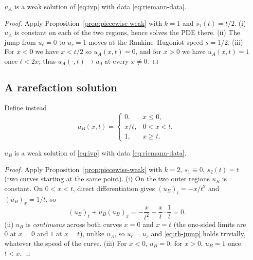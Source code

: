 \begin{proposition}
\label{prop:shock-is-weak-solution}
$u_A$ is a weak solution of \eqref{eq:ivp} with data \eqref{eq:riemann-data}.
\end{proposition}

\begin{proof}
Apply Proposition~\ref{prop:piecewise-weak} with $k=1$ and $s_1(t)=t/2$.
(i) $u_A$ is constant on each of the two regions, hence solves the PDE
there. (ii) The jump from $u_\ell=0$ to $u_r=1$ moves at the
Rankine--Hugoniot speed $s=1/2$. (iii) For $x<0$ we have $x<t/2$ so
$u_A(x,t)=0$, and for $x>0$ we have $u_A(x,t)=1$ once $t<2x$; thus
$u_A(\cdot,t)\to u_0$ at every $x\ne0$.
\end{proof}

\subsection{A rarefaction solution}
\label{subsec:nonuniq-rarefaction}

Define instead
\begin{equation}
  \label{eq:rarefaction-solution}
  u_B(x,t) = \begin{cases}
    0, & x \le 0, \\
    x/t, & 0 < x < t, \\
    1, & x \ge t.
  \end{cases}
\end{equation}

\begin{proposition}
\label{prop:rarefaction-is-weak-solution}
$u_B$ is a weak solution of \eqref{eq:ivp} with data \eqref{eq:riemann-data}.
\end{proposition}

\begin{proof}
Apply Proposition~\ref{prop:piecewise-weak} with $k=2$, $s_1\equiv0$,
$s_2(t)=t$ (two curves starting at the same point). (i) On the two outer
regions $u_B$ is constant. On $0<x<t$, direct differentiation gives
$(u_B)_t = -x/t^2$ and $(u_B)_x = 1/t$, so
\begin{equation}
  \label{eq:fan-check}
  (u_B)_t + u_B (u_B)_x = -\frac{x}{t^2} + \frac{x}{t}\cdot\frac{1}{t} = 0.
\end{equation}
(ii) $u_B$ is \emph{continuous} across both curves $x=0$ and $x=t$ (the
one-sided limits are $0$ at $x=0$ and $1$ at $x=t$), unlike $u_A$, so
$u_\ell=u_r$ and \eqref{eq:rh-jump} holds trivially, whatever the speed
of the curve. (iii) For $x<0$, $u_B=0$; for $x>0$, $u_B=1$ once $t<x$.
\end{proof}


